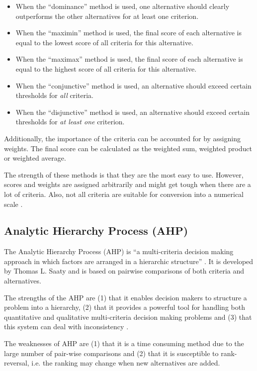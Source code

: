 \begin{itemize}
    \item When the ``dominance'' method is used, one alternative should clearly outperforms the other alternatives for at least one criterion. 
    \item When the ``maximin'' method is used, the final score of each alternative is equal to the lowest score of all criteria for this alternative.
    \item When the ``maximax'' method is used, the final score of each alternative is equal to the highest score of all criteria for this alternative.
    \item When the ``conjunctive'' method is used, an alternative should exceed certain thresholds for \emph{all} criteria.
    \item When the ``disjunctive'' method is used, an alternative should exceed certain thresholds for \emph{at least one} criterion. 
\end{itemize}

Additionally, the importance of the criteria can be accounted for by assigning weights. The final score can be calculated as the weighted sum, weighted product or weighted average.

The strength of these methods is that they are the most easy to use. However,  scores and weights are assigned arbitrarily and might get tough when there are a lot of criteria. Also, not all criteria are suitable for conversion into a numerical scale \cite{Jadhav:2009}.

\subsection{Analytic Hierarchy Process (AHP)}
\label{sec:ahp}

The Analytic Hierarchy Process (AHP) is ``a multi-criteria decision making approach in which factors are arranged in a hierarchic structure'' \cite{Saaty:1990}. It is developed by Thomas L. Saaty and is based on pairwise comparisons of both criteria and alternatives. 

The strengths of the AHP are (1) that it enables decision makers to structure a problem into a hierarchy, (2) that it provides a powerful tool for handling both quantitative and qualitative multi-criteria decision making problems and (3) that this system can deal with inconsistency \cite{Jadhav:2009}. 

The weaknesses of AHP are (1) that it is a time consuming method due to the large number of pair-wise comparisons and (2) that it is susceptible to rank-reversal, i.e. the ranking may change  when new alternatives are added.

